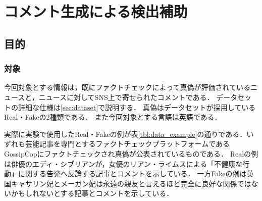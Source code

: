 \chapter{コメント生成による検出補助}\label{ch:gen_com}
\section{目的}\label{sec:gen_pur}
\label{ch:purpose}
\subsection{対象}
今回対象とする情報は，既にファクトチェックによって真偽が評価されているニュースと，ニュースに対してSNS上で寄せられたコメントである．
データセットの詳細な仕様は\cref{sec:dataset}で説明する．
真偽はデータセットが採用しているReal・Fakeの2種類である．
また今回対象とする言語は英語である．

実際に実験で使用したReal・Fakeの例が表\ref{tbl:data_example}の通りである．いずれも芸能記事を専門とするファクトチェックプラットフォームであるGossipCopにファクトチェックされ真偽が公表されているものである．
Realの例は俳優のエディ・シブリアンが，女優のリアン・ライムスによる「不健康な行動」に関する告発へ反論する記事\cite{calvario_2017}とコメントを示している．
一方Fakeの例は英国キャサリン妃とメーガン妃は永遠の親友と言えるほど完全に良好な関係ではないかもしれないとする記事\cite{bahou_2018}とコメントを示している．

